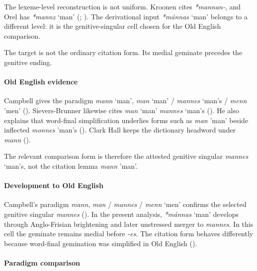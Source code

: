\documentclass[
  british,
  a4paper,
]{article}
\providecommand{\Recon}[1]{\emph{*#1}}
\begin{document}
The lexeme-level reconstruction is not uniform. Kroonen cites
\emph{*mannan-}, and Orel has \Recon{mannz} `man'
(;
). The derivational input
\Recon{mánnas} `man' belongs to a different level: it is the
genitive-singular cell chosen for the Old English comparison.

The target is not the ordinary citation form. Its medial geminate
precedes the genitive ending.

\paragraph{Old English evidence}\label{old-english-evidence-126}

Campbell gives the paradigm {\emph{mann}} `man', {\emph{man}} `man' /
{\emph{mannes}} `man's / {\emph{menn}} 'men'
(). Sievers-Brunner
likewise cites {\emph{man}} `man' {\emph{mannes}} `man's
(). He also
explains that word-final simplification underlies forms such as
{\emph{man}} 'man' beside inflected {\emph{monnes}} 'man's
(). Clark Hall
keeps the dictionary headword under {\emph{mann}}
().

The relevant comparison form is therefore the attested genitive singular
{\emph{mannes}} `man's, not the citation lemma {\emph{mann}} 'man'.

\paragraph{Development to Old
English}\label{development-to-old-english-126}

Campbell's paradigm \emph{mann}, \emph{man} / \emph{mannes} /
{\emph{menn}} `men' confirms the selected genitive singular
\emph{mannes} ().
In the present analysis, \Recon{mánnas} `man' develops through
Anglo-Frisian brightening and later unstressed merger to \emph{mannes}.
In this cell the geminate remains medial before \emph{-es}. The citation
form behaves differently because word-final gemination was simplified in
Old English ().

\paragraph{Paradigm comparison}\label{paradigm-comparison-9}
\end{document}

